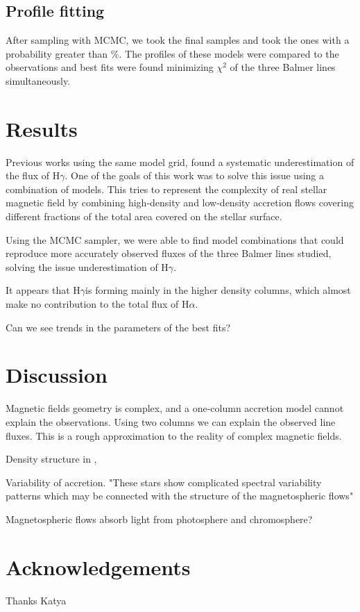 \documentclass[twocolumn,linenumbers]{aastex631}
\newcommand{\halpha}{H$\alpha$}
\newcommand{\hgamma}{H$\gamma$}
\begin{document}
\subsection{Profile fitting}

After sampling with MCMC, we took the final samples and took the ones with a probability greater than \%. The profiles of these models were compared to the observations and best fits were found minimizing $\chi^2$ of the three Balmer lines simultaneously.

\section{Results}

Previous works using the same model grid, found a systematic underestimation of the flux of \hgamma. One of the goals of this work was to solve this issue using a combination of models. This tries to represent the complexity of real stellar magnetic field by combining high-density and low-density accretion flows covering different fractions of the total area covered on the stellar surface.

Using the MCMC sampler, we were able to find model combinations that could reproduce more accurately observed fluxes of the three Balmer lines studied, solving the issue underestimation of \hgamma.

It appears that \hgamma is forming mainly in the higher density columns, which almost make no contribution to the total flux of \halpha. 

Can we see trends in the parameters of the best fits?

\section{Discussion} \label{Discussion}

Magnetic fields geometry is complex, and a one-column accretion model cannot explain the observations. Using two columns we can explain the observed line fluxes. This is a rough approximation to the reality of complex magnetic fields.

Density structure in \citet{zhaohuan2024}, \citet{espaillat2021}

Variability of accretion. "These stars show complicated spectral variability patterns which may be connected with the structure of the magnetospheric flows" \citep{romanova2003}

Magnetospheric flows absorb light from photosphere and chromosphere? \citep{atom2023}

\section*{Acknowledgements}

Thanks Katya


{}

\end{document}
